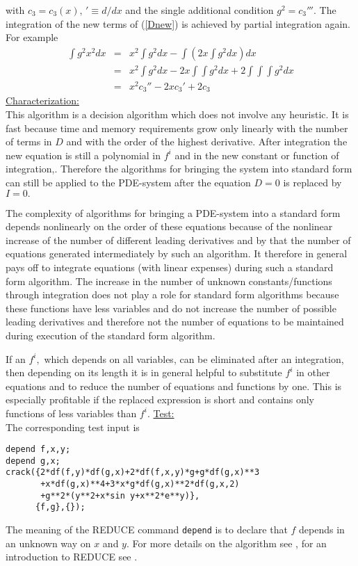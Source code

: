 with $c_3 = c_3(x), \, '\equiv d/dx$ and the single additional
condition $g^2 = c_3'''.$
The integration of the new terms of (\ref{Dnew}) is
achieved by partial integration again. For example
\begin{eqnarray*}
\int g^2x^2 dx & = & x^2\int g^2 dx - \int (2x\!\int g^2 dx) dx \\
& = & x^2\int g^2 dx - 2x\int\!\!\int g^2 dx
+ 2 \int\!\!\int\!\!\int g^2 dx \\
& = & x^2c_3'' - 2xc_3' + 2c_3
\end{eqnarray*}
\underline{Characterization:} \\
This algorithm is a decision algorithm which does not involve any
heuristic. It is fast because time and memory requirements grow only
linearly with the number of terms in $D$ and with the order of
the highest derivative.
After integration the new equation is still a polynomial
in $f^i$ and in the new constant or function of integration,.
Therefore the algorithms for bringing the system into standard form can still
be applied to the PDE-system
after the equation $D = 0$ is replaced by $I = 0.$

The complexity of algorithms for bringing a PDE-system into a standard
form depends nonlinearly on the order of these equations because of
the nonlinear increase of the number of different leading derivatives
and by that the number of equations generated intermediately by such
an algorithm. It therefore in general pays off to integrate equations (with
linear expenses) during such a standard form algorithm.  The increase
in the number of unknown constants/functions through integration does
not play a role for standard form algorithms because these functions
have less variables and do not increase the number of possible leading
derivatives and therefore not the number of equations to be maintained
during execution of the standard form algorithm.

If an $f^i,$ which depends on all variables, can be eliminated after an
integration, then depending on its length
it is in general helpful to substitute $f^i$ in other equations and
to reduce the number of equations and functions by one. This is especially
profitable if the replaced expression is short and
contains only functions of less variables than $f^i.$
\underline{Test:} \\
The corresponding test input is
\begin{verbatim}
depend f,x,y;
depend g,x;
crack({2*df(f,y)*df(g,x)+2*df(f,x,y)*g+g*df(g,x)**3
       +x*df(g,x)**4+3*x*g*df(g,x)**2*df(g,x,2)
       +g**2*(y**2+x*sin y+x**2*e**y)},
      {f,g},{});
\end{verbatim}
The meaning of the REDUCE command {\tt depend} is to declare that $f$
depends in an unknown way on $x$ and $y$. For more details on the
algorithm see \cite{WoInt}, for an introduction to REDUCE see \cite{WM}.

